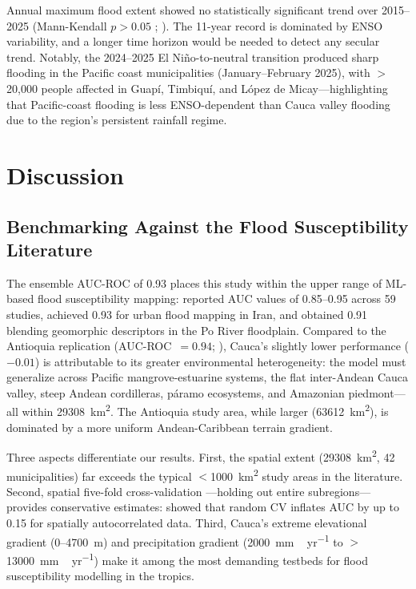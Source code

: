 \documentclass{article}
\begin{document}
Annual maximum flood extent showed no statistically significant trend over 2015--2025 (Mann-Kendall $p > 0.05$ \citep{Mann1945}; \citep{Sen1968}). The 11-year record is dominated by ENSO variability, and a longer time horizon would be needed to detect any secular trend. Notably, the 2024--2025 El Ni\~no-to-neutral transition produced sharp flooding in the Pacific coast municipalities (January--February 2025), with $>$20,000 people affected in Guap\'i, Timbiqu\'i, and L\'opez de Micay---highlighting that Pacific-coast flooding is less ENSO-dependent than Cauca valley flooding due to the region's persistent rainfall regime.

\section{Discussion}
\label{sec:discussion}

\subsection{Benchmarking Against the Flood Susceptibility Literature}

The ensemble AUC-ROC of 0.93 places this study within the upper range of ML-based flood susceptibility mapping: \citet{Mosavi2018} reported AUC values of 0.85--0.95 across 59 studies, \citet{Darabi2021} achieved 0.93 for urban flood mapping in Iran, and \citet{Magnini2022} obtained 0.91 blending geomorphic descriptors in the Po River floodplain. Compared to the Antioquia replication (AUC-ROC~$= 0.94$; \citealt{EspinalMaya2026}), Cauca's slightly lower performance ($-0.01$) is attributable to its greater environmental heterogeneity: the model must generalize across Pacific mangrove-estuarine systems, the flat inter-Andean Cauca valley, steep Andean cordilleras, p\'aramo ecosystems, and Amazonian piedmont---all within \SI{29308}{\kilo\metre\squared}. The Antioquia study area, while larger (\SI{63612}{\kilo\metre\squared}), is dominated by a more uniform Andean-Caribbean terrain gradient.

Three aspects differentiate our results. First, the spatial extent (\SI{29308}{\kilo\metre\squared}, 42 municipalities) far exceeds the typical $<$\SI{1000}{\kilo\metre\squared} study areas in the literature. Second, spatial five-fold cross-validation \citep{Roberts2017}---holding out entire subregions---provides conservative estimates: \citet{Roberts2017} showed that random CV inflates AUC by up to 0.15 for spatially autocorrelated data. Third, Cauca's extreme elevational gradient (0--\SI{4700}{\metre}) and precipitation gradient (\SI{2000}{mm\,yr^{-1}} to $>$\SI{13000}{mm\,yr^{-1}}) make it among the most demanding testbeds for flood susceptibility modelling in the tropics.
\end{document}
